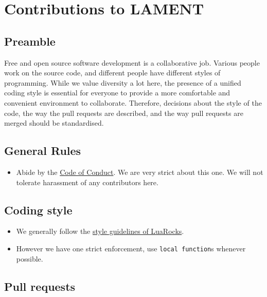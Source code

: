 
\section{Contributions to LAMENT}\label{contributions-to-lament}

\subsection{Preamble}\label{preamble}

Free and open source software development is a collaborative job.
Various people work on the source code, and different people have
different styles of programming. While we value diversity a lot here,
the presence of a unified coding style is essential for everyone to
provide a more comfortable and convenient environment to collaborate.
Therefore, decisions about the style of the code, the way the pull
requests are described, and the way pull requests are merged should be
standardised.

\subsection{General Rules}\label{general-rules}

\begin{itemize}
\tightlist
\item
  Abide by the \href{CODE_OF_CONDUCT.md}{Code of Conduct}. We are very
  strict about this one. We will not tolerate harassment of any
  contributors here.
\end{itemize}

\subsection{Coding style}\label{coding-style}

\begin{itemize}
\tightlist
\item
  We generally follow the
  \href{https://github.com/luarocks/lua-style-guide}{style guidelines of
  LuaRocks}.
\item
  However we have one strict enforcement, use \texttt{local\ function}s
  whenever possible.
\end{itemize}

\subsection{Pull requests}\label{pull-requests}

